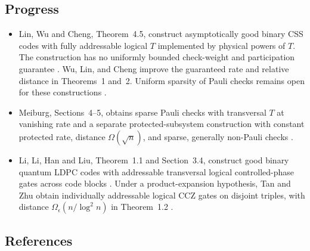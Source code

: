 \subsection*{Progress}

\begin{itemize}
  \item Lin, Wu and Cheng, Theorem~4.5, construct asymptotically good binary CSS codes with fully addressable logical $T$ implemented by physical powers of $T$. The construction has no uniformly bounded check-weight and participation guarantee . Wu, Lin, and Cheng improve the guaranteed rate and relative distance in Theorems~1 and~2. Uniform sparsity of Pauli checks remains open for these constructions .

  \item Meiburg, Sections~4--5, obtains sparse Pauli checks with transversal $T$ at vanishing rate and a separate protected-subsystem construction with constant protected rate, distance $\Omega(\sqrt n)$, and sparse, generally non-Pauli checks .

  \item Li, Li, Han and Liu, Theorem~1.1 and Section~3.4, construct good binary quantum LDPC codes with addressable transversal logical controlled-phase gates across code blocks . Under a product-expansion hypothesis, Tan and Zhu obtain individually addressable logical CCZ gates on disjoint triples, with distance $\Omega_\epsilon(n/\log^2 n)$ in Theorem~1.2 .
\end{itemize}

\subsection*{References}


